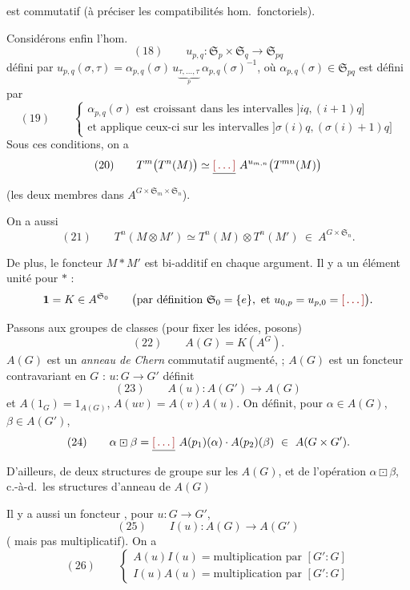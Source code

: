 \documentclass[11pt,a4paper]{article}
\begin{document}
est commutatif (à préciser les compatibilités \ill{} hom.\ fonctoriels).

Considérons enfin l'hom.
\[ (18) \qquad u_{p,q} : \mathfrak{S}_{p} \times \mathfrak{S}_{q}
   \longrightarrow \mathfrak{S}_{pq} \]
défini par
$u_{p,q}(\sigma, \tau) = \alpha_{p,q}(\sigma)\,
u_{\underbrace{\tau, \ldots, \tau}_{p}}\, \alpha_{p,q}(\sigma)^{-1}$,
où $\alpha_{p,q}(\sigma) \in \mathfrak{S}_{pq}$ est défini par
\[ (19) \qquad \begin{cases}
   \alpha_{p,q}(\sigma) \text{ est croissant dans les intervalles }
     \bigl] iq, (i+1)q \bigr] \\
   \text{et applique ceux-ci sur les intervalles }
     \bigl] \sigma(i) q, (\sigma(i)+1) q \bigr]
\end{cases} \]
Sous ces conditions, on a
\[ (20) \qquad T^{m}\bigl(T^{n}(M)\bigr) \simeq \struck{\ill{}}\
   A^{u_{m,n}}\bigl(T^{mn}(M)\bigr) \]
(les deux membres dans $A^{G \times \mathfrak{S}_{m} \times \mathfrak{S}_{n}}$).


On a aussi
\[ (21) \qquad T^{n}(M \otimes M') \simeq T^{n}(M) \otimes T^{n}(M')
   \ \in \ A^{G \times \mathfrak{S}_{n}} . \]



De plus, le foncteur $M * M'$ est bi-additif en chaque argument. Il y a un
élément unité pour $*$ :
\[ \mathbf{1} = K \in A^{\mathfrak{S}_{0}} \qquad
   \bigl( \text{par définition } \mathfrak{S}_{0} = \{e\} , \text{ et }
   u_{0,p} = u_{p,0} = \ill{} \bigr) . \]

Passons aux groupes de classes (pour fixer les idées, posons)
\[ (22) \qquad A(G) = K(A^{G}) . \]
$A(G)$ est un \struck{\ill{}} \emph{anneau de Chern} commutatif augmenté,
\ill{} ; $A(G)$ est un foncteur \struck{covariant} contravariant en $G$ :
$u : G \to G'$ définit
\[ (23) \qquad A(u) : A(G') \longrightarrow A(G) \]
et $A(1_{G}) = 1_{A(G)}$, $A(uv) = A(v) A(u)$. On définit, pour $\alpha \in A(G)$,
$\beta \in A(G')$,
\[ (24) \qquad \alpha \boxdot \beta = \struck{\ill{}}\
   A(p_{1})(\alpha) \cdot A(p_{2})(\beta) \ \in \ A(G \times G') . \]
D'ailleurs, \ill{} de deux structures de groupe sur les $A(G)$, et de l'opération
$\alpha \boxdot \beta$, c.-à-d.\ les structures d'anneau de $A(G)$ \ill{}

Il y a aussi un foncteur \add{additif}, pour $u : G \to G'$,
\[ (25) \qquad I(u) : A(G) \longrightarrow A(G') \]
(\ill{} mais pas multiplicatif). On a
\[ (26) \qquad \begin{cases}
   A(u) I(u) = \text{multiplication par } [G' : G] \\
   I(u) A(u) = \text{multiplication par } [G' : G]
\end{cases} \]
\end{document}
